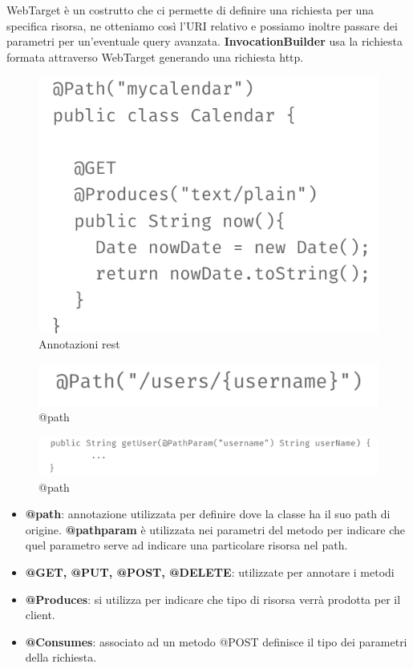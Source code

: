 \documentclass[12pt]{article}
\begin{document}
	WebTarget è un costrutto che ci permette di definire una richiesta per una specifica risorsa, ne otteniamo così l'URI relativo e possiamo inoltre passare dei parametri per un'eventuale query avanzata.
	\textbf{InvocationBuilder} usa la richiesta formata attraverso WebTarget generando una richiesta http.
	\begin{figure}[h!]
		\centering
		\includegraphics[scale=0.40]{img/rest2.png}
		\caption{Annotazioni rest}
	\end{figure} 
	\begin{figure}[h!]
		\centering
		\includegraphics[scale=0.40]{img/pat.png}
		\caption{@path}
	\end{figure} 
	\begin{figure}[h!]
		\centering
		\includegraphics[scale=0.40]{img/pat1.png}
		\caption{@path}
	\end{figure} 
	\begin{itemize}
		\item \textbf{@path}: annotazione utilizzata per definire dove la classe ha il suo path di origine. \textbf{@pathparam} è utilizzata nei parametri del metodo per indicare che quel parametro serve ad indicare una particolare risorsa nel path.  
		\item \textbf{@GET, @PUT, @POST, @DELETE}: utilizzate per annotare i metodi
		\item \textbf{@Produces}: si utilizza per indicare che tipo di risorsa verrà prodotta per il client.
		\item \textbf{@Consumes}: associato ad un metodo @POST definisce il tipo dei parametri della richiesta.
	\end{itemize}
\end{document}
